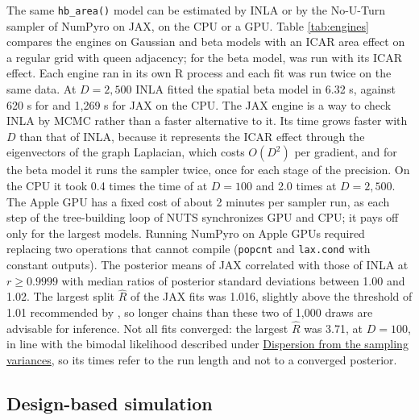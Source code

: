 The same \texttt{hb\_area()} model can be estimated by INLA or by the No-U-Turn sampler of NumPyro on JAX, on the CPU or a GPU. Table \ref{tab:engines} compares the engines on Gaussian and beta models with an ICAR area effect on a regular grid with queen adjacency; for the beta model,  was run with its ICAR effect. Each engine ran in its own R process and each fit was run twice on the same data. At \(D = 2,500\) INLA fitted the spatial beta model in 6.32 s, against 620 s for  and 1,269 s for JAX on the CPU. The JAX engine is a way to check INLA by MCMC rather than a faster alternative to it. Its time grows faster with \(D\) than that of INLA, because it represents the ICAR effect through the eigenvectors of the graph Laplacian, which costs \(O(D^2)\) per gradient, and for the beta model it runs the sampler twice, once for each stage of the precision. On the CPU it took 0.4 times the time of  at \(D = 100\) and 2.0 times at \(D = 2,500\). The Apple GPU has a fixed cost of about 2 minutes per sampler run, as each step of the tree-building loop of NUTS synchronizes GPU and CPU; it pays off only for the largest models. Running NumPyro on Apple GPUs required replacing two operations that  cannot compile (\texttt{popcnt} and \texttt{lax.cond} with constant outputs). The posterior means of JAX correlated with those of INLA at \(r \ge 0.9999\) with median ratios of posterior standard deviations between 1.00 and 1.02. The largest split \(\hat{R}\) of the JAX fits was 1.016, slightly above the threshold of 1.01 recommended by \citet{vehtari2021rank}, so longer chains than these two of 1,000 draws are advisable for inference. Not all  fits converged: the largest \(\hat{R}\) was 3.71, at \(D = 100\), in line with the bimodal likelihood described under \hyperref[sec:methods-dispersion]{Dispersion from the sampling variances}, so its times refer to the run length and not to a converged posterior.

\subsection{Design-based simulation}\label{sec:mc}


